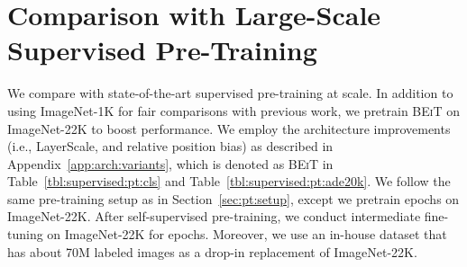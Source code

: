 \documentclass{article}
\newcommand\our{\textsc{BEiT}}
\begin{document}
\section{Comparison with Large-Scale Supervised Pre-Training}
\label{app:cmp:supervised:pt}

We compare with state-of-the-art supervised pre-training at scale.
In addition to using ImageNet-1K for fair comparisons with previous work, we pretrain \our{} on ImageNet-22K to boost performance.
We employ the architecture improvements (i.e., LayerScale, and relative position bias) as described in Appendix~\ref{app:arch:variants}, which is denoted as \our{} in Table~\ref{tbl:supervised:pt:cls} and Table~\ref{tbl:supervised:pt:ade20k}.
We follow the same pre-training setup as in Section~\ref{sec:pt:setup}, except we pretrain  epochs on ImageNet-22K.
After self-supervised pre-training, we conduct intermediate fine-tuning on ImageNet-22K for  epochs.
Moreover, we use an in-house dataset that has about 70M labeled images as a drop-in replacement of ImageNet-22K.
\end{document}
